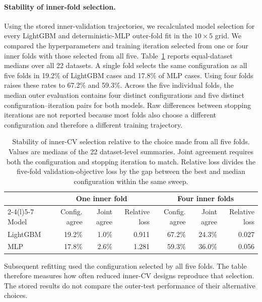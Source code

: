 \paragraph{Stability of inner-fold selection.}
Using the stored inner-validation trajectories, we recalculated model selection for every LightGBM
and deterministic-MLP outer-fold fit in the $10\times5$ grid. We compared the hyperparameters and
training iteration selected from one or four inner folds with those selected from all five.
Table~\ref{tab:inner-selection-stability} reports equal-dataset medians over all 22 datasets. A
single fold selects the same configuration as all five folds in 19.2\% of LightGBM cases and 17.8\%
of MLP cases. Using four folds raises these rates to 67.2\% and 59.3\%. Across the five individual
folds, the median outer evaluation contains four distinct configurations and five distinct
configuration--iteration pairs for both models. Raw differences between stopping iterations are
not reported because most folds also choose a different configuration and therefore a different
training trajectory.

\begin{table}[!htbp]
\centering
\caption{Stability of inner-CV selection relative to the choice made from all five folds. Values
are medians of the 22 dataset-level summaries. Joint agreement requires both the configuration and
stopping iteration to match. Relative loss divides the five-fold validation-objective loss by the
gap between the best and median configuration within the same sweep.}
\label{tab:inner-selection-stability}
\scriptsize
\setlength{\tabcolsep}{3pt}
\begin{tabular}{@{}lrrrrrr@{}}
\toprule
& \multicolumn{3}{c}{One inner fold} & \multicolumn{3}{c}{Four inner folds} \\
\cmidrule(lr){2-4}\cmidrule(l){5-7}
Model & Config. agree & Joint agree & Relative loss & Config. agree & Joint agree & Relative loss \\
\midrule
LightGBM & 19.2\% & 1.0\% & 0.911 & 67.2\% & 24.3\% & 0.027 \\
MLP & 17.8\% & 2.6\% & 1.281 & 59.3\% & 36.0\% & 0.056 \\
\bottomrule
\end{tabular}
\end{table}

Subsequent refitting used the configuration selected by all five folds. The table therefore measures
how often reduced inner-CV designs reproduce that selection. The stored results do not compare the
outer-test performance of their alternative choices.
